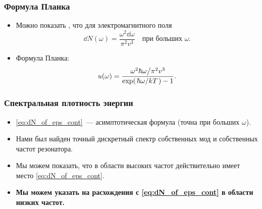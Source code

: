 \documentclass[compress]{beamer}
\begin{document}
    \begin{frame}\frametitle{Формула Планка}

        \begin{itemize}\justifying

            \item Можно показать \cite{sivuhin_opt}, что для электромагнитного поля
            \begin{equation}\label{eq:dN_of_eps_cont}
                \dd{N(\omega)} = \frac{\omega^2 \dd{\omega}}{\pi^2 v^3} \quad
                    \text{при больших $\omega$}.
            \end{equation}

            \item Формула Планка:
            \begin{equation}
                u(\omega) = \frac{
                        \flatfrac{\omega^2 \hbar\omega}{\pi^2 v^3}
                }{\exp(\flatfrac{\hbar\omega}{kT}) - 1} .
            \end{equation}

        \end{itemize}

    \end{frame}


    \begin{frame}\frametitle{Спектральная плотность энергии}

        \begin{itemize}\justifying

            \item \autoref{eq:dN_of_eps_cont}~--- асимптотическая формула (точна при больших $\omega$).

            \item Нами был найден точный дискретный спектр собственных мод и собственных частот резонатора.

            \item Мы можем показать, что в области высоких частот действительно имеет место \autoref{eq:dN_of_eps_cont}.

            \item \textbf{Мы можем указать на расхождения с \autoref{eq:dN_of_eps_cont} в области низких частот.}

        \end{itemize}

    \end{frame}
\end{document}
